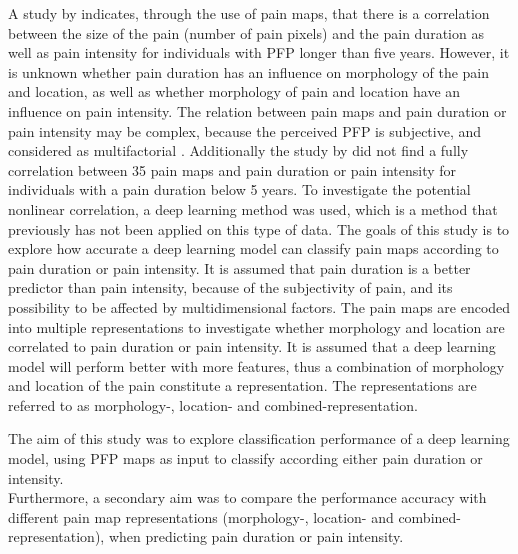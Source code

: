 \noindent
A study by \citeauthor{Boudreau2017} \citep{Boudreau2017} indicates, through the use of pain maps, that there is a correlation between the size of the pain (number of pain pixels) and the pain duration as well as pain intensity for individuals with PFP longer than five years.\citep{Boudreau2017}
However, it is unknown whether pain duration has an influence on morphology of the pain and location, as well as  whether morphology of pain and location have an influence on pain intensity.\newline
\noindent
The relation between pain maps and pain duration or pain intensity may be complex, because the perceived PFP is subjective, and considered as multifactorial \citep{Dansie2013}. Additionally the study by \citeauthor{Boudreau2017} \citep{Boudreau2017} did not find a fully correlation between 35 pain maps and pain duration or pain intensity for individuals with a pain duration below 5 years. To investigate the potential nonlinear correlation, a deep learning method was used, which is a method that previously has not been applied on this type of data. \newline
\noindent
The goals of this study is to explore how accurate a deep learning model can classify pain maps according to pain duration or pain intensity. It is assumed that pain duration is a better predictor than pain intensity, because of the subjectivity of pain, and its possibility to be affected by multidimensional factors. 
The pain maps are encoded into multiple representations to investigate whether morphology and location are correlated to pain duration or pain intensity.\newline
\noindent
It is assumed that a deep learning model will perform better with more features, thus a combination of morphology and location of the pain constitute a representation.  The representations are referred to as morphology-, location- and combined-representation.


\noindent
The aim of this study was to explore classification performance of a deep learning model, using PFP maps as input to classify according either pain duration or intensity. \\
\noindent
Furthermore, a secondary aim was to compare the performance accuracy with different pain map representations (morphology-, location- and combined-representation), when predicting pain duration or pain intensity. 



